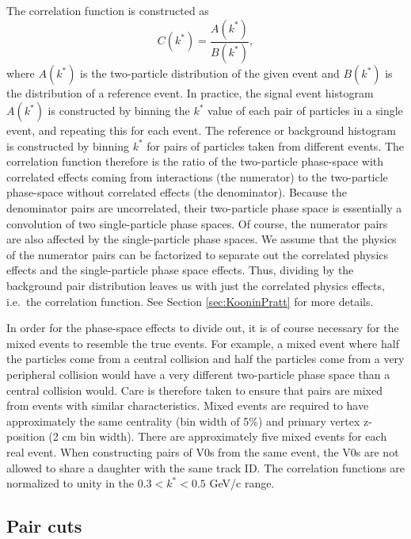 The correlation function is constructed as
\begin{equation}
\label{eq:CFDefinition}
C(k^*) = \frac{A(k^*)}{B(k^*)},
\end{equation}
where $A(k^*)$ is the two-particle distribution of the given event and $B(k^*)$ is the distribution of a reference event.  
In practice, the signal event histogram $A(k^*)$ is constructed by binning the $k^*$ value of each pair of particles in a single event, and repeating this for each event.  
The reference or background histogram is constructed by binning $k^*$ for pairs of particles taken from different events.  
The correlation function therefore is the ratio of the two-particle phase-space with correlated effects coming from interactions (the numerator) to the two-particle phase-space without correlated effects (the denominator).
Because the denominator pairs are uncorrelated, their two-particle phase space is essentially a convolution of two single-particle phase spaces.
Of course, the numerator pairs are also affected by the single-particle phase spaces.
We assume that the physics of the numerator pairs can be factorized to separate out the correlated physics effects and the single-particle phase space effects.
Thus, dividing by the background pair distribution leaves us with just the correlated physics effects, i.e.\ the correlation function. See Section \ref{sec:KooninPratt} for more details.

In order for the phase-space effects to divide out, it is of course necessary for the mixed events to resemble the true events.
For example, a mixed event where half the particles come from a central collision and half the particles come from a very peripheral collision would have a very different two-particle phase space than a central collision would.
Care is therefore taken to ensure that pairs are mixed from events with similar characteristics. 
Mixed events are required to have approximately the same centrality (bin width of 5\%) and primary vertex z-position (2 cm bin width).  
There are approximately five mixed events for each real event.  
When constructing pairs of V0s from the same event, the V0s are not allowed to share a daughter with the same track ID. 
The correlation functions are normalized to unity in the $ 0.3 < k^* < 0.5$ GeV/c range.

\subsection{Pair cuts}
\label{sec:PairWiseCuts}

